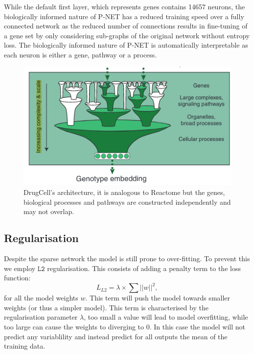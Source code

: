 \documentclass[NOTE, disdraft=true, UKenglish]{\DISCDTLATEXPATH UCLCDTDISdoc}
\begin{document}
While the default first layer, which represents genes contains 14657 neurons, the biologically informed nature of P-NET has a reduced training speed over a fully connected network as the reduced number of connections results in fine-tuning of a gene set by only considering sub-graphs of the original network without entropy loss. The biologically informed nature of P-NET is automatically interpretable as each neuron is either a gene, pathway or a process.

\begin{figure}
    \centering
    \includegraphics[width=\linewidth]{Figures/drugcell_architecture.png}
    \caption{DrugCell's \cite{kuenzi_predicting_2020} architecture, it is analogous to Reactome but the genes, biological processes and pathways are constructed independently and may not overlap.}
    \label{fig:2}
\end{figure}

\subsection{Regularisation}
Despite the sparse network the model is still prone to over-fitting. To prevent this we employ $\mathtt{L2}$ regularisation. This consists of adding a penalty term to the loss function:
\begin{equation}
    L_{L2} = \lambda \times \sum ||w||^2,
\end{equation}
for all the model weights $w$. This term will push the model towards smaller weights (or thus a simpler model). This term is characterised by the regularisation parameter $\lambda$, too small a value will lead to model overfitting, while too large can cause the weights to diverging to 0. In this case the model will not predict any variablility and instead predict for all outputs the mean of the training data.
\end{document}
